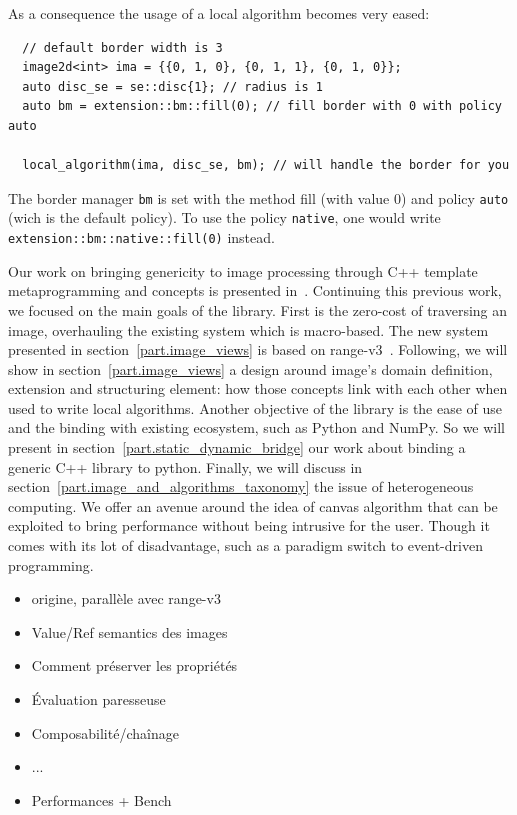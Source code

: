 As a consequence the usage of a local algorithm becomes very eased:

\begin{verbatim}
  // default border width is 3
  image2d<int> ima = {{0, 1, 0}, {0, 1, 1}, {0, 1, 0}};
  auto disc_se = se::disc{1}; // radius is 1
  auto bm = extension::bm::fill(0); // fill border with 0 with policy auto

  local_algorithm(ima, disc_se, bm); // will handle the border for you
\end{verbatim}

The border manager \texttt{bm} is set with the method fill (with value 0) and policy \texttt{auto} (wich is the default
policy). To use the policy \texttt{native}, one would write \texttt{extension::bm::native::fill(0)} instead.


Our work on bringing genericity to image processing through C++ template metaprogramming and concepts is presented
in~\citep{roynard.2019.rrpr}. Continuing this previous work, we focused on the main goals of the library. First is the
zero-cost of traversing an image, overhauling the existing system which is macro-based. The new system presented in
section~\ref{part.image_views} is based on
range-v3~\cite{niebler.2014.ranges,niebler.2018.deepranges,niebler.2018.mergingranges}. Following, we will show in
section~\ref{part.image_views} a design around image's domain definition, extension and structuring element: how those
concepts link with each other when used to write local algorithms. Another objective of the library is the ease of use
and the binding with existing ecosystem, such as Python and NumPy. So we will present in
section~\ref{part.static_dynamic_bridge} our work about binding a generic C++ library to python. Finally, we will
discuss in section~\ref{part.image_and_algorithms_taxonomy} the issue of heterogeneous computing. We offer an avenue
around the idea of canvas algorithm that can be exploited to bring performance without being intrusive for the user.
Though it comes with its lot of disadvantage, such as a paradigm switch to event-driven programming.


\clearpage


\begin{itemize}
  \item origine, parallèle avec range-v3
  \item Value/Ref semantics des images
  \item Comment préserver les propriétés
  \item Évaluation paresseuse
  \item Composabilité/chaînage
  \item ...
  \item Performances + Bench
\end{itemize}